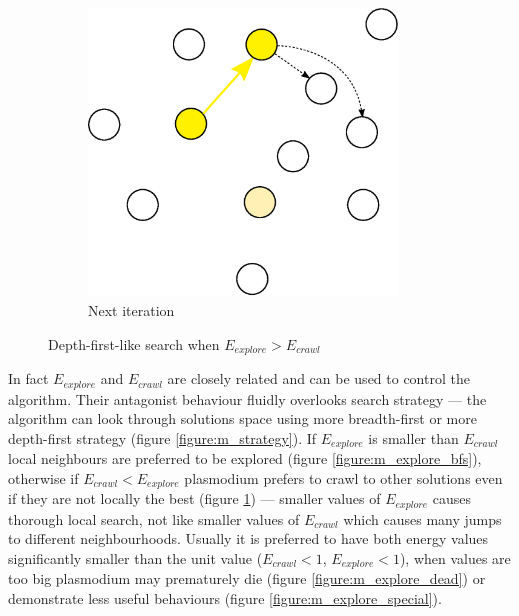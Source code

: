 \documentclass[english,a4paper,twoside]{ppfcmthesis}
\begin{document}
\begin{figure}
\begin{subfigure}{0.3\textwidth}
  \end{subfigure}
  \begin{subfigure}{0.3\textwidth}
    \centering
    \includegraphics[width=0.9\textwidth]{algorithm/metaheuristic/dfs3.eps}
    \caption{Next iteration}
  \end{subfigure}

  \caption{Depth-first-like search when $E_{explore} > E_{crawl}$}
  \label{figure:m_explore_dfs}
\end{figure}

In fact $E_{explore}$ and $E_{crawl}$ are closely related and can be used to control the algorithm. Their antagonist behaviour fluidly overlooks search strategy --- the algorithm can look through solutions space using more breadth-first or more depth-first strategy (figure \ref{figure:m_strategy}). If $E_{explore}$ is smaller than $E_{crawl}$ local neighbours are preferred to be explored (figure \ref{figure:m_explore_bfs}), otherwise if $E_{crawl} < E_{explore}$ plasmodium prefers to crawl to other solutions even if they are not locally the best (figure \ref{figure:m_explore_dfs}) --- smaller values of $E_{explore}$ causes thorough local search, not like smaller values of $E_{crawl}$ which causes many jumps to different neighbourhoods. Usually it is preferred to have both energy values significantly smaller than the unit value ($E_{crawl} < 1$, $E_{explore} < 1$), when values are too big plasmodium may prematurely die (figure \ref{figure:m_explore_dead}) or demonstrate less useful behaviours (figure \ref{figure:m_explore_special}).
\end{document}
